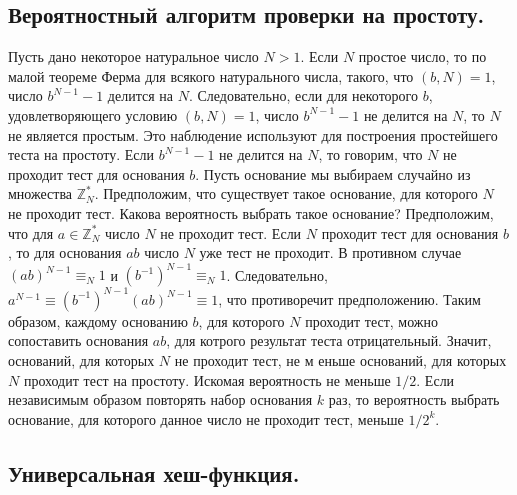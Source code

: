 \subsection{Вероятностный алгоритм проверки на простоту.}
Пусть дано некоторое натуральное число $N > 1$. Если $N$ простое число, то по малой теореме Ферма для всякого натурального числа, такого, что $(b, N) = 1$, число $b^{N -1} - 1$ делится на $N$. Следовательно, если для некоторого $b$, удовлетворяющего условию $(b, N) = 1$, число $b^{N-1} - 1$ не делится на $N$, то $N$ не является простым. Это наблюдение используют для построения простейшего теста на простоту. Если $b^{N-1} - 1$  не делится на $N$, то говорим, что $N$ не проходит тест для основания $b$.
\newline
Пусть основание мы выбираем случайно из множества $\mathbb{Z}_N^*$. Предположим, что существует такое основание, для которого $N$ не проходит тест. Какова вероятность выбрать такое основание?
\newline
Предположим, что для $a \in \mathbb{Z}_N^*$ число $N$ не проходит тест. Если $N$ проходит тест для основания $b$, то для основания $ab$ число $N$ уже тест не проходит. В противном случае $(ab)^{N-1} \equiv_N 1$ и $(b^{-1})^{N-1} \equiv_N 1$. Следовательно, $a^{N-1} \equiv (b^{-1})^{N-1}(ab)^{N-1} \equiv 1$, что противоречит предположению. Таким образом, каждому основанию $b$, для которого $N$ проходит тест, можно сопоставить основания $ab$, для котрого результат теста отрицательный. Значит, оснований, для которых $N$ не проходит тест, не м еньше оснований, для которых $N$ проходит тест на простоту. Искомая вероятность не меньше $1/2$. Если независимым образом повторять набор основания $k$ раз, то вероятность выбрать основание, для которого данное число не проходит тест, меньше $1/2^k$.

\subsection{Универсальная хеш-функция.}
